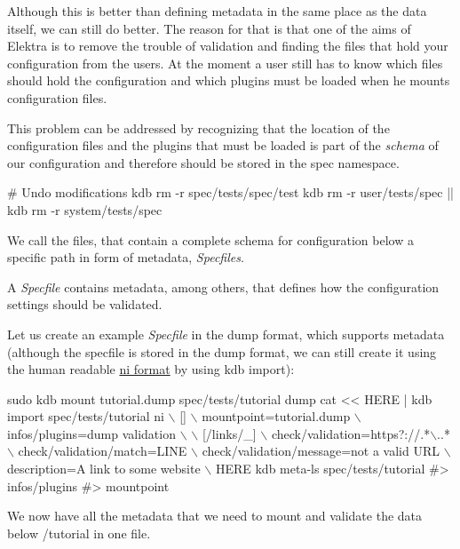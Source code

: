 Although this is better than defining metadata in the same place as the data itself, we can still do better. The reason for that is that one of the aims of Elektra is to remove the trouble of validation and finding the files that hold your configuration from the users. At the moment a user still has to know which files should hold the configuration and which plugins must be loaded when he mounts configuration files.

This problem can be addressed by recognizing that the location of the configuration files and the plugins that must be loaded is part of the {\itshape schema} of our configuration and therefore should be stored in the spec namespace.


\begin{DoxyCode}
# Undo modifications
kdb rm -r spec/tests/spec/test
kdb rm -r user/tests/spec || kdb rm -r system/tests/spec
\end{DoxyCode}


We call the files, that contain a complete schema for configuration below a specific path in form of metadata, {\itshape Specfiles}.

A {\itshape Specfile} contains metadata, among others, that defines how the configuration settings should be validated.

Let us create an example {\itshape Specfile} in the dump format, which supports metadata (although the specfile is stored in the dump format, we can still create it using the human readable \hyperlink{autotoc_md502_src_plugins_ni_README_md}{ni format} by using {\ttfamily kdb import})\+:


\begin{DoxyCode}
sudo kdb mount tutorial.dump spec/tests/tutorial dump
cat << HERE | kdb import spec/tests/tutorial ni  \(\backslash\)
[]                                         \(\backslash\)
 mountpoint=tutorial.dump                \(\backslash\)
 infos/plugins=dump validation           \(\backslash\)
                                           \(\backslash\)
[/links/\_]                                 \(\backslash\)
check/validation=https?://.*\(\backslash\)..*         \(\backslash\)
check/validation/match=LINE              \(\backslash\)
check/validation/message=not a valid URL \(\backslash\)
description=A link to some website       \(\backslash\)
HERE
kdb meta-ls spec/tests/tutorial
#> infos/plugins
#> mountpoint
\end{DoxyCode}


We now have all the metadata that we need to mount and validate the data below {\ttfamily /tutorial} in one file.


